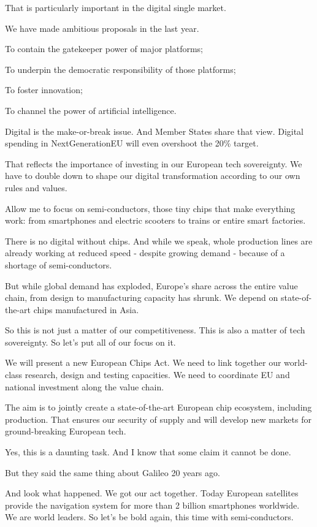 \documentclass[a4paper,11pt]{article}
\begin{document}
That is particularly important in the digital single market. 

We have made ambitious proposals in the last year.

To contain the gatekeeper power of major platforms;

To underpin the democratic responsibility of those platforms;

To foster innovation;

To channel the power of artificial intelligence.

 

Digital is the make-or-break issue. And Member States share that view. Digital spending in NextGenerationEU will even overshoot the 20\% target.

That reflects the importance of investing in our European tech sovereignty. We have to double down to shape our digital transformation according to our own rules and values.

Allow me to focus on semi-conductors, those tiny chips that make everything work: from smartphones and electric scooters to trains or entire smart factories.

There is no digital without chips. And while we speak, whole production lines are already working at reduced speed - despite growing demand - because of a shortage of semi-conductors.

But while global demand has exploded, Europe's share across the entire value chain, from design to manufacturing capacity has shrunk. We depend on state-of-the-art chips manufactured in Asia.

So this is not just a matter of our competitiveness. This is also a matter of tech sovereignty. So let's put all of our focus on it.

We will present a new European Chips Act. We need to link together our world-class research, design and testing capacities. We need to coordinate EU and national investment along the value chain.

The aim is to jointly create a state-of-the-art European chip ecosystem, including production. That ensures our security of supply and will develop new markets for ground-breaking European tech.

Yes, this is a daunting task. And I know that some claim it cannot be done.

But they said the same thing about Galileo 20 years ago.

And look what happened. We got our act together. Today European satellites provide the navigation system for more than 2 billion smartphones worldwide. We are world leaders. So let's be bold again, this time with semi-conductors.
\end{document}
